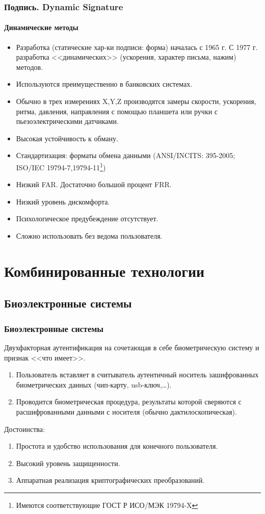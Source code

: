 \begin{frame}[allowframebreaks]
\frametitle{Подпись. Dynamic Signature}
\framesubtitle{Динамические методы}

\begin{itemize}
    \item Разработка (статические хар-ки подписи: форма) началась с 1965 г. С 1977 г. разработка <<динамических>> (ускорения, характер письма, нажим) методов.
    \item Используются преимущественно в банковских системах.
    \item Обычно в трех измерениях X,Y,Z производятся замеры скорости, ускорения, ритма, давления, направления с помощью планшета или ручки с пьезоэлектрическими датчиками.
    \item Высокая устойчивость к обману.
    \item Стандартизация: форматы обмена данными (ANSI/INCITS: 395-2005; ISO/IEC 19794-7,19794-11\footnote{Имеются соответствующие ГОСТ Р ИСО/МЭК 19794-X}) 
    \item Низкий FAR. Достаточно большой процент FRR.
    \item Низкий уровень дискомфорта.
    \item Психологическое предубеждение отсутствует.
    \item Сложно использовать без ведома пользователя.
\end{itemize}
\end{frame}



\section{Комбинированные технологии}


\subsection{Биоэлектронные системы}


\begin{frame}
\frametitle{Биоэлектронные системы}
Двухфакторная аутентификация на сочетающая в себе биометрическую систему и признак <<что имеет>>.
\begin{enumerate}
    \item Пользователь вставляет в считыватель аутентичный носитель зашифрованных биометрических данных (чип-карту, usb-ключ,\ldots).
    \item Проводится биометрическая процедура, результаты которой сверяются с расшифрованными данными с носителя (обычно дактилоскопическая).
\end{enumerate}
Достоинства:
\begin{enumerate}
    \item Простота и удобство использования для конечного пользователя.
    \item Высокий уровень защищенности.
    \item Аппаратная реализация криптографических преобразований.
\end{enumerate}
\end{frame}


